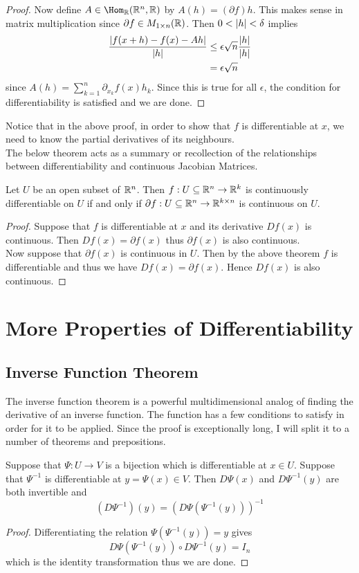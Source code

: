 \documentclass[a4paper]{article}
\begin{document}
\begin{thm}{}{}
\begin{proof}
Now define $A\in\Hom_\R(\R^n,\R)$ by $A(h)=(\partial f)h$. This makes sense in matrix multiplication since $\partial f\in M_{1\times n}(\mathbb{R})$. Then $0<\abs{h}<\delta$ implies 
\begin{align*}
\frac{\abs{f(x+h)-f(x)-Ah}}{\abs{h}}&\leq\epsilon\sqrt{n}\frac{\abs{h}}{\abs{h}}\\
&=\epsilon\sqrt{n}
\end{align*} since $A(h)=\sum_{k=1}^n\partial_{x_k}f(x)h_k$. Since this is true for all $\epsilon$, the condition for differentiability is satisfied and we are done. 
\end{proof}
\end{thm}

Notice that in the above proof, in order to show that $f$ is differentiable at $x$, we need to know the partial derivatives of its neighbours. \\

The below theorem acts as a summary or recollection of the relationships between differentiability and continuous Jacobian Matrices. 

\begin{thm}{}{} Let $U$ be an open subset of $\mathbb{R}^n$. Then $f:U\subseteq\mathbb{R}^n\to\mathbb{R}^k$ is continuously differentiable on $U$ if and only if $\partial f:U\subseteq\mathbb{R}^n\to\mathbb{R}^{k\times n}$ is continuous on $U$. 
\begin{proof}
Suppose that $f$ is differentiable at $x$ and its derivative $Df(x)$ is continuous. Then $Df(x)=\partial f(x)$ thus $\partial f(x)$ is also continuous. \\
Now suppose that $\partial f(x)$ is continuous in $U$. Then by the above theorem $f$ is differentiable and thus we have $Df(x)=\partial f(x)$. Hence $Df(x)$ is also continuous. 
\end{proof}
\end{thm}

\pagebreak
\section{More Properties of Differentiability}
\subsection{Inverse Function Theorem}
The inverse function theorem is a powerful multidimensional analog of finding the derivative of an inverse function. The function has a few conditions to satisfy in order for it to be applied. Since the proof is exceptionally long, I will split it to a number of theorems and prepositions. 
\begin{prp}{}{} Suppose that $\Psi:U\to V$ is a bijection which is differentiable at $x\in U$. Suppose that $\Psi^{-1}$ is differentiable at $y=\Psi(x)\in V$. Then $D\Psi(x)$ and $D\Psi^{-1}(y)$ are both invertible and $$(D\Psi^{-1})(y)=(D\Psi(\Psi^{-1}(y)))^{-1}$$ 
\begin{proof}
Differentiating the relation $\Psi(\Psi^{-1}(y))=y$ gives $$D\Psi(\Psi^{-1}(y))\circ D\Psi^{-1}(y)=I_n$$ which is the identity transformation thus we are done. 
\end{proof}
\end{prp}
\end{document}
